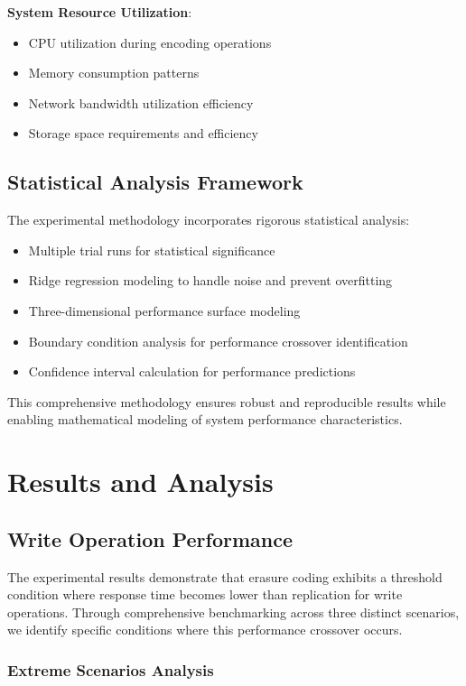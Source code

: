 \textbf{System Resource Utilization}:
\begin{itemize}
\item CPU utilization during encoding operations
\item Memory consumption patterns
\item Network bandwidth utilization efficiency
\item Storage space requirements and efficiency
\end{itemize}

\subsection{Statistical Analysis Framework}

The experimental methodology incorporates rigorous statistical analysis:
\begin{itemize}
\item Multiple trial runs for statistical significance
\item Ridge regression modeling to handle noise and prevent overfitting
\item Three-dimensional performance surface modeling
\item Boundary condition analysis for performance crossover identification
\item Confidence interval calculation for performance predictions
\end{itemize}

This comprehensive methodology ensures robust and reproducible results while enabling mathematical modeling of system performance characteristics.

\section{Results and Analysis}

\subsection{Write Operation Performance}

The experimental results demonstrate that erasure coding exhibits a threshold condition where response time becomes lower than replication for write operations. Through comprehensive benchmarking across three distinct scenarios, we identify specific conditions where this performance crossover occurs.

\subsubsection{Extreme Scenarios Analysis}

